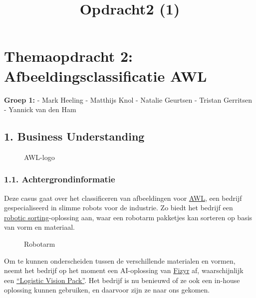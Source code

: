 \documentclass[11pt]{article}
\title{Opdracht2 (1)}
\begin{document}
    
    \maketitle
    
    

    
    \section{\texorpdfstring{\textbf{Themaopdracht 2:
Afbeeldingsclassificatie
AWL}}{Themaopdracht 2: Afbeeldingsclassificatie AWL}}\label{themaopdracht-2-afbeeldingsclassificatie-awl}

\textbf{Groep 1:} - Mark Heeling - Matthijs Knol - Natalie Geurtsen -
Tristan Gerritsen - Yannick van den Ham

    \subsection{1. Business Understanding}\label{business-understanding}

\begin{figure}
\centering
{}
\caption{AWL-logo}
\end{figure}

\subsubsection{1.1. Achtergrondinformatie}\label{achtergrondinformatie}

Deze casus gaat over het classificeren van afbeeldingen voor
\href{https://awl.nl/}{AWL}, een bedrijf gespecialiseerd in slimme
robots voor de industrie. Zo biedt het bedrijf een
\href{https://awl.nl/nl/product/pakketpost-distributie/}{robotic
sorting}-oplossing aan, waar een robotarm pakketjes kan sorteren op
basis van vorm en materiaal.

\begin{figure}
\centering
{}
\caption{Robotarm}
\end{figure}

Om te kunnen onderscheiden tussen de verschillende materialen en vormen,
neemt het bedrijf op het moment een AI-oplossing van
\href{https://fizyr.com}{Fizyr} af, waarschijnlijk een
\href{https://fizyr.com/vision-packs/}{``Logistic Vision Pack''}. Het
bedrijf is nu benieuwd of ze ook een in-house oplossing kunnen
gebruiken, en daarvoor zijn ze naar ons gekomen.
\end{document}
